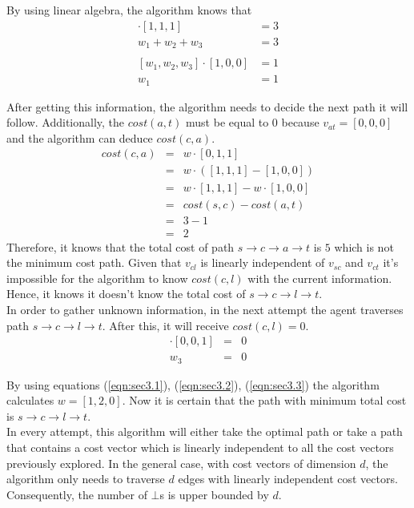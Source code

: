 By using linear algebra, the algorithm knows that
\begin{align}
  [w_1,w_2,w_3]\cdot [1,1,1] &=  3 \nonumber\\
  w_1+w_2+w_3 &=  3 \label{eqn:sec3.1}\\
  \nonumber\\
  [w_1,w_2,w_3] \cdot [1,0,0] &= 1 \nonumber\\
  w_1 &=  1 \label{eqn:sec3.2}
\end{align}

After getting this information, the algorithm needs to decide the next path it will follow. Additionally, the $cost(a,t)$ must be equal to $0$ because $v_{at} = [0,0,0]$ and the algorithm can deduce $cost(c,a)$.
\begin{eqnarray*}
  cost(c,a) &=&  w \cdot [0,1,1] \\
  &=&  w \cdot ([1,1,1] - [1,0,0]) \\
  &=&  w \cdot [1,1,1] - w \cdot [1,0,0] \\
  &=&  cost(s,c) - cost(a,t) \\
  &=&  3 - 1 \\
  &=&  2
\end{eqnarray*}
Therefore, it knows that the total cost of path $s \to c \to a \to t$ is $5$ which is not the minimum cost path.
Given that $v_{cl}$ is linearly independent of $v_{sc}$ and $v_{ct}$ it's impossible for the algorithm to know $cost(c,l)$ with the current information. Hence, it knows it doesn't know the total cost of $s \to c \to l \to t$. \\

In order to gather unknown information, in the next attempt the agent traverses path $s \to c \to l \to t$. After this, it will receive $cost(c,l) = 0$.
\begin{eqnarray}
  [w_1,w_2,w_3] \cdot [0,0,1] &=& 0 \nonumber\\
  w_3 &=& 0 \label{eqn:sec3.3}
\end{eqnarray}

By using equations (\ref{eqn:sec3.1}), (\ref{eqn:sec3.2}), (\ref{eqn:sec3.3}) the algorithm calculates $w=[1,2,0]$.
Now it is certain that the path with minimum total cost is $s \to c \to l \to t$. \\

In every attempt, this algorithm will either take the optimal path or take a path that contains a cost vector which is linearly independent to all the cost vectors previously explored. In the general case, with cost vectors of dimension $d$, the algorithm only needs to traverse $d$ edges with linearly independent cost vectors. Consequently, the number of $\bot$s is upper bounded by $d$.
